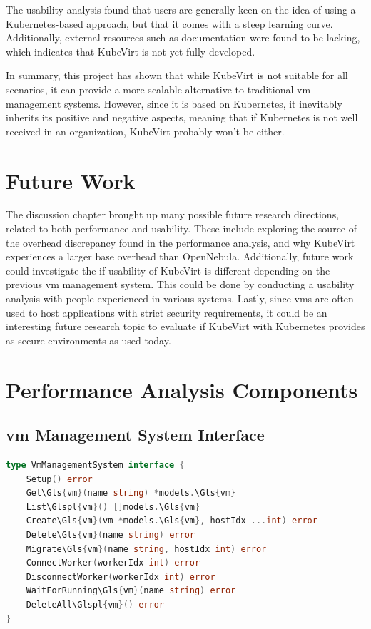 \documentclass{kththesis}
\begin{document}
\begin{enumerate}
The usability analysis found that users are generally keen on the idea of using a Kubernetes-based approach, but that it comes with a steep learning curve. Additionally, external resources such as documentation were found to be lacking, which indicates that KubeVirt is not yet fully developed. 

In summary, this project has shown that while KubeVirt is not suitable for all scenarios, it can provide a more scalable alternative to traditional \Gls{vm} management systems. However, since it is based on Kubernetes, it inevitably inherits its positive and negative aspects, meaning that if Kubernetes is not well received in an organization, KubeVirt probably won't be either.

\cleardoublepage
\chapter{Future Work}
The discussion chapter brought up many possible future research directions, related to both performance and usability. These include exploring the source of the overhead discrepancy found in the performance analysis, and why KubeVirt experiences a larger base overhead than OpenNebula. Additionally, future work could investigate the if usability of KubeVirt is different depending on the previous \Gls{vm} management system. This could be done by conducting a usability analysis with people experienced in various systems. Lastly, since \Glspl{vm} are often used to host applications with strict security requirements, it could be an interesting future research topic to evaluate if KubeVirt with Kubernetes provides as secure environments as used today.

\cleardoublepage
\printbibliography[heading=bibintoc]

\appendix

\chapter{Performance Analysis Components}

\section{\Gls{vm} Management System Interface}
\label{appendix:vmm-interface}
\begin{lstlisting}[language=Go]
type VmManagementSystem interface {
    Setup() error
    Get\Gls{vm}(name string) *models.\Gls{vm}
    List\Glspl{vm}() []models.\Gls{vm}
    Create\Gls{vm}(vm *models.\Gls{vm}, hostIdx ...int) error
    Delete\Gls{vm}(name string) error
    Migrate\Gls{vm}(name string, hostIdx int) error
    ConnectWorker(workerIdx int) error
    DisconnectWorker(workerIdx int) error
    WaitForRunning\Gls{vm}(name string) error
    DeleteAll\Glspl{vm}() error
}
\end{lstlisting}


\end{enumerate}
\end{document}
